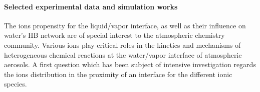 
\paragraph{Selected experimental data and simulation works}
The ions propensity for the liquid/vapor interface, as well as their influence on  
water's HB network are of special interest to the atmospheric chemistry community.%
Various ions play critical roles in the kinetics and mechanisms of heterogeneous chemical reactions 
at the water/vapor interface of atmospheric aerosols. 
A first question which has been subject of intensive investigation regards the ions distribution in the proximity of an interface for the different ionic species.

